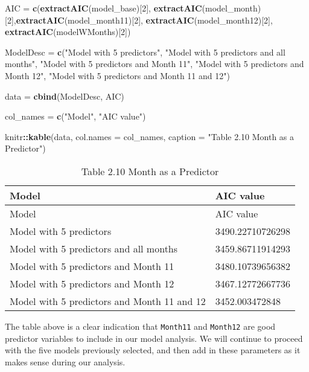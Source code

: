 \documentclass[
]{article}
\newenvironment{Shaded}{\begin{snugshade}}{\end{snugshade}}
\newcommand{\DataTypeTok}[1]{\textcolor[rgb]{0.13,0.29,0.53}{#1}}
\newcommand{\DecValTok}[1]{\textcolor[rgb]{0.00,0.00,0.81}{#1}}
\newcommand{\KeywordTok}[1]{\textcolor[rgb]{0.13,0.29,0.53}{\textbf{#1}}}
\newcommand{\NormalTok}[1]{#1}
\newcommand{\OperatorTok}[1]{\textcolor[rgb]{0.81,0.36,0.00}{\textbf{#1}}}
\newcommand{\StringTok}[1]{\textcolor[rgb]{0.31,0.60,0.02}{#1}}
\begin{document}
\begin{Shaded}
\begin{Highlighting}[]
\NormalTok{AIC =}\StringTok{ }\KeywordTok{c}\NormalTok{(}\KeywordTok{extractAIC}\NormalTok{(model_base)[}\DecValTok{2}\NormalTok{],  }\KeywordTok{extractAIC}\NormalTok{(model_month)[}\DecValTok{2}\NormalTok{],}\KeywordTok{extractAIC}\NormalTok{(model_month11)[}\DecValTok{2}\NormalTok{],}
        \KeywordTok{extractAIC}\NormalTok{(model_month12)[}\DecValTok{2}\NormalTok{], }\KeywordTok{extractAIC}\NormalTok{(modelWMonths)[}\DecValTok{2}\NormalTok{])}

\NormalTok{ModelDesc =}\StringTok{ }\KeywordTok{c}\NormalTok{(}\StringTok{"Model with 5 predictors"}\NormalTok{, }\StringTok{"Model with 5 predictors and all months"}\NormalTok{, }\StringTok{"Model with 5 predictors and Month 11"}\NormalTok{, }\StringTok{"Model with 5 predictors and Month 12"}\NormalTok{, }\StringTok{"Model with 5 predictors and Month 11 and 12"}\NormalTok{)}

\NormalTok{data =}\StringTok{ }\KeywordTok{cbind}\NormalTok{(ModelDesc, AIC)}

\NormalTok{col_names =}\StringTok{ }\KeywordTok{c}\NormalTok{(}\StringTok{"Model"}\NormalTok{, }\StringTok{"AIC value"}\NormalTok{)}

\NormalTok{knitr}\OperatorTok{::}\KeywordTok{kable}\NormalTok{(data, }\DataTypeTok{col.names =}\NormalTok{ col_names,  }\DataTypeTok{caption =} \StringTok{"Table 2.10 Month as a Predictor"}\NormalTok{)}
\end{Highlighting}
\end{Shaded}

\begin{longtable}[]{@{}ll@{}}
\caption{Table 2.10 Month as a Predictor}\tabularnewline
\toprule
Model & AIC value\tabularnewline
\midrule
\endfirsthead
\toprule
Model & AIC value\tabularnewline
\midrule
\endhead
Model with 5 predictors & 3490.22710726298\tabularnewline
Model with 5 predictors and all months & 3459.86711914293\tabularnewline
Model with 5 predictors and Month 11 & 3480.10739656382\tabularnewline
Model with 5 predictors and Month 12 & 3467.12772667736\tabularnewline
Model with 5 predictors and Month 11 and 12 &
3452.003472848\tabularnewline
\bottomrule
\end{longtable}

The table above is a clear indication that \texttt{Month11} and
\texttt{Month12} are good predictor variables to include in our model
analysis. We will continue to proceed with the five models previously
selected, and then add in these parameters as it makes sense during our
analysis.
\end{document}

